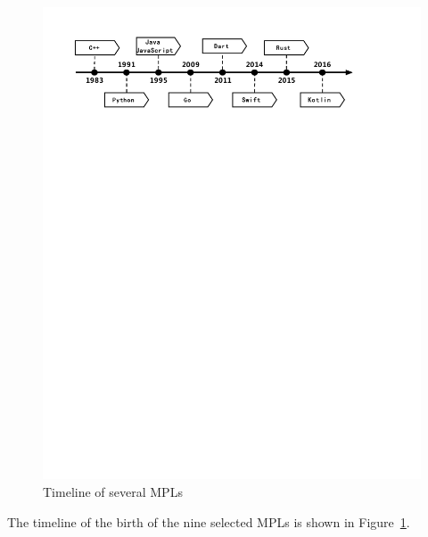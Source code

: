 \begin{figure}[htbp]
    \centerline{\includegraphics[scale=0.6]{figures/timeline}}
    \caption{Timeline of several MPLs}
    \label{fig:timeline}
\end{figure}


The timeline of the birth of the nine selected MPLs is shown in Figure~\ref{fig:timeline}.



